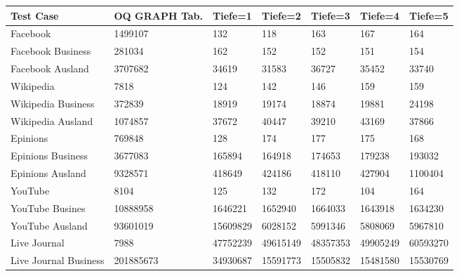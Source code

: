 \begin{tabularx}{\textwidth}{X X X X X X X}
	\textbf{Test Case} & \textbf{OQ GRAPH Tab.}    & \textbf{Tiefe=1}  & \textbf{Tiefe=2} & \textbf{Tiefe=3} & \textbf{Tiefe=4} & \textbf{Tiefe=5} \\
	\hline
	Facebook&	1499107&	132& 118& 163&	167& 164\\
	Facebook Business&	281034&	162&	152&	152& 151&	154\\
	Facebook Ausland &	3707682&	34619&	31583&	36727&	35452&	33740\\
	Wikipedia&	7818&	124&	142&	146&	159&	159\\
	Wikipedia Business&	372839&	18919&	19174&	18874&	19881&	24198\\
	Wikipedia Ausland &	1074857&	37672&	40447&	39210&	43169&	37866\\
	Epinions&	769848&	128&	174&	177&	175&	168\\
	Epinions Business&3677083&	165894&	164918&	174653&	179238&	193032\\
	Epinions Ausland &	9328571 &418649&	424186&	418110&	427904&	1100404\\
	YouTube&8104&	125&	132&	172&	104&	164\\
	YouTube Busines&	10888958&	1646221&1652940&	1664033&	1643918&	1634230\\
	YouTube Ausland &93601019&15609829&	6028152	&5991346&	5808069&	5967810\\
	Live Journal&7988	&	47752239&	49615149&	48357353&	49905249&	60593270\\
	Live Journal Business&201885673	&	34930687&	15591773&	15505832&	15481580&	15530769\\
\end{tabularx}
